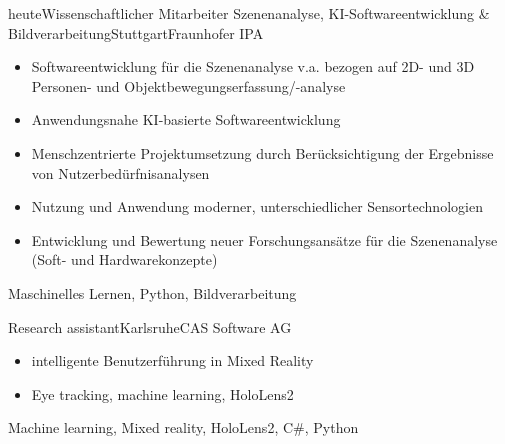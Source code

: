 {\begin{experiences}
        \end{experiences}
    }{
    
    \begin{experiences}
    \experience
    {heute}{Wissenschaftlicher Mitarbeiter Szenenanalyse, KI-Softwareentwicklung \& Bildverarbeitung}{Stuttgart}{Fraunhofer IPA}
    {}  
    {   \begin{itemize}                 
            \item Softwareentwicklung für die Szenenanalyse v.a. bezogen auf 2D- und 3D Personen- und Objektbewegungserfassung/-analyse
            \item Anwendungsnahe KI-basierte Softwareentwicklung
            \item Menschzentrierte Projektumsetzung durch Berücksichtigung der Ergebnisse von Nutzerbedürfnisanalysen
            \item Nutzung und Anwendung moderner, unterschiedlicher Sensortechnologien
            \item Entwicklung und Bewertung neuer Forschungsansätze für die Szenenanalyse (Soft- und Hardwarekonzepte)
        \end{itemize}
    }
    {Maschinelles Lernen, Python, Bildverarbeitung}
        
    \emptySeparator
    
    \experience
    {}   {Research assistant}{Karlsruhe}{CAS Software AG}
    {
    } 
    {
        \begin{itemize}                 
            \item intelligente Benutzerführung in Mixed Reality
            \item Eye tracking, machine learning, HoloLens2
        \end{itemize}
    }
    {Machine learning, Mixed reality, HoloLens2, C\#, Python}
    \end{experiences}
}